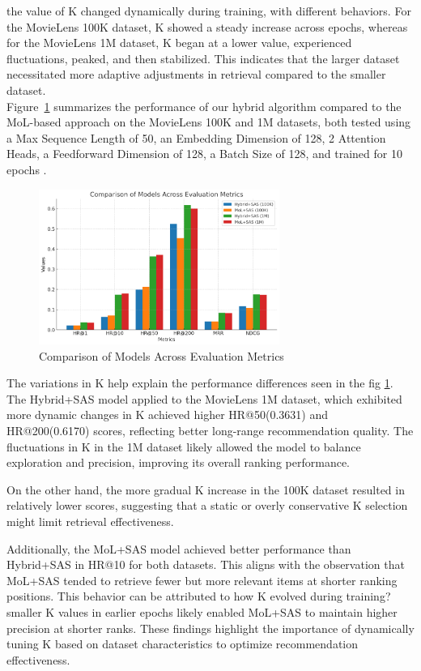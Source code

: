 the value of K changed dynamically during training, with different behaviors. For the MovieLens 100K dataset, K showed a steady increase across epochs, whereas for the MovieLens 1M dataset, K began at a lower value, experienced fluctuations, peaked, and then stabilized. This indicates that the larger dataset necessitated more adaptive adjustments in retrieval compared to the smaller dataset.\\
Figure~\ref{histo_p} summarizes the performance of our hybrid algorithm compared to the MoL-based approach on the MovieLens 100K and 1M datasets, both tested using a Max Sequence Length of 50, an Embedding Dimension of 128, 2 Attention Heads, a Feedforward Dimension of 128, a Batch Size of 128, and trained for 10 epochs . \\
\begin{figure}[ht]
	\centering
	\includegraphics[width=0.7\textwidth]{Figures/HISTOGRAM.png}
	\caption{Comparison of Models Across Evaluation Metrics}\label{histo_p}
\end{figure}
The variations in K help explain the performance differences seen in the fig \ref{histo_p}. The Hybrid+SAS model applied to the MovieLens 1M dataset, which exhibited more dynamic changes in K achieved higher HR@50(0.3631) and HR@200(0.6170) scores, reflecting better long-range recommendation quality. The fluctuations in K in the 1M dataset likely allowed the model to balance exploration and precision, improving its overall ranking performance.

On the other hand, the more gradual K increase in the 100K dataset resulted in relatively lower scores, suggesting that a static or overly conservative 
K selection might limit retrieval effectiveness.

Additionally, the MoL+SAS model achieved better performance than Hybrid+SAS in HR@10 for both datasets. This aligns with the observation that MoL+SAS tended to retrieve fewer but more relevant items at shorter ranking positions. This behavior can be attributed to how K evolved during training?smaller K values in earlier epochs likely enabled MoL+SAS to maintain higher precision at shorter ranks.
These findings highlight the importance of dynamically tuning K based on dataset characteristics to optimize recommendation effectiveness.


